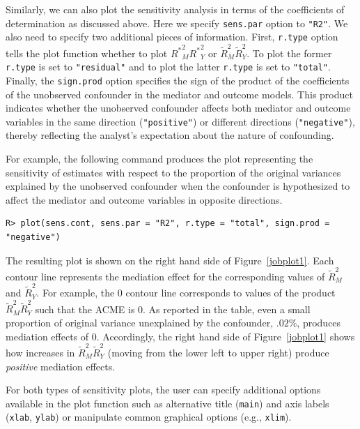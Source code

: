 \documentclass[11pt,letterpaper]{article}
\theoremstyle{plain}
\begin{document}
Similarly, we can also plot the sensitivity analysis in terms of the
coefficients of determination as discussed above. Here we specify \texttt{sens.par}
option to \texttt{"R2"}.  We also need to specify two additional pieces of information.
First, \texttt{r.type} option tells the plot function whether to plot
${R^\ast}^2_M{R^\ast}^2_Y$ or $\widetilde{R}^2_M\widetilde{R}^2_Y$. To plot the
former \texttt{r.type} is set to \texttt{"residual"} and to plot the latter 
\texttt{r.type} is set
to \texttt{"total"}.  Finally, the \texttt{sign.prod} option specifies the sign of the
product of the coefficients of the unobserved confounder in the mediator and outcome models.
This product indicates whether the unobserved confounder affects both mediator and outcome
variables in the same direction (\texttt{"positive"}) or different directions 
(\texttt{"negative"}), thereby
reflecting the analyst's expectation about the nature of confounding.

For example, the following command produces the plot representing the sensitivity
of estimates with respect to the proportion of the original variances explained by
the unobserved confounder when the confounder is hypothesized to affect the mediator
and outcome variables in opposite directions.
\begin{verbatim}
R> plot(sens.cont, sens.par = "R2", r.type = "total", sign.prod = "negative")
\end{verbatim}
The resulting plot is shown on the right hand side of Figure~\ref{jobplot1}. Each contour
line represents the mediation effect for the corresponding values of
$\widetilde{R}^2_M$ and $\widetilde{R}^2_Y$. For example, the 0 contour line
corresponds to values of the product $\widetilde{R}^2_M\widetilde{R}^2_Y$ such
that the ACME is 0. As reported in the table, even a small proportion of
original variance unexplained by the confounder, $.02\%$, produces mediation
effects of 0.  Accordingly, the right hand side of Figure~\ref{jobplot1} shows
how increases in $\widetilde{R}^2_M\widetilde{R}^2_Y$ (moving from the lower
left to upper right) produce \emph{positive} mediation effects.

For both types of sensitivity plots, the user can specify additional options
available in the plot function such as alternative
title (\texttt{main}) and axis labels (\texttt{xlab}, \texttt{ylab}) or
manipulate common graphical options (e.g., \texttt{xlim}).
\end{document}
